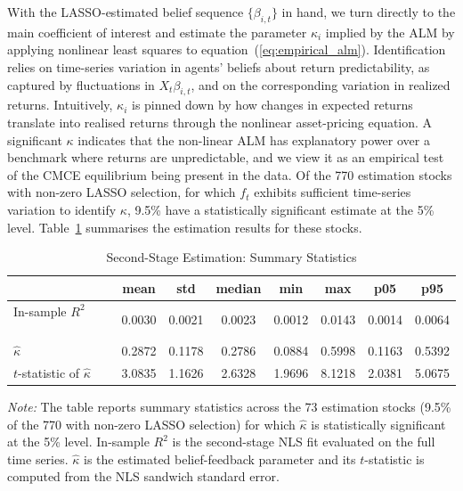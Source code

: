 \documentclass[11pt]{article}
\begin{document}
With the LASSO-estimated belief sequence $\{\beta_{i,t}\}$ in hand, we turn directly to the main coefficient of interest and estimate the parameter $\kappa_{i}$ implied by the ALM by applying nonlinear least squares to equation~(\ref{eq:empirical_alm}).
Identification relies on time-series variation in agents’ beliefs about return predictability, as captured by fluctuations in $X_t \beta_{i,t}$, and on the corresponding variation in realized returns.
Intuitively, $\kappa_{i}$ is pinned down by how changes in expected returns translate into realised returns through the nonlinear asset-pricing equation.
A significant $\kappa$ indicates that the non-linear ALM has explanatory power over a benchmark where returns are unpredictable, and we view it as an empirical test of the CMCE equilibrium being present in the data.
Of the 770 estimation stocks with non-zero LASSO selection, for which $f_t$ exhibits sufficient time-series variation to identify $\kappa$, 9.5\% have a statistically significant estimate at the 5\% level.
Table~\ref{tab:summary_stats_stage2} summarises the estimation results for these stocks.

\begin{table}[H]
\centering
\caption{Second-Stage Estimation: Summary Statistics}
\label{tab:summary_stats_stage2}
\begin{tabularx}{\textwidth}{@{}>{\small}Xccccccc@{}}
\toprule
 & mean & std & median & min & max & p05 & p95 \\
\midrule
In-sample $R^2$        & 0.0030 & 0.0021 & 0.0023 & 0.0012 & 0.0143 & 0.0014 & 0.0064 \\
$\hat{\kappa}$         & 0.2872 & 0.1178 & 0.2786 & 0.0884 & 0.5998 & 0.1163 & 0.5392 \\
$t$-statistic of $\hat{\kappa}$ & 3.0835 & 1.1626 & 2.6328 & 1.9696 & 8.1218 & 2.0381 & 5.0675 \\
\bottomrule
\end{tabularx}
\medskip
\begin{minipage}{\textwidth}
\footnotesize
\textit{Note:} The table reports summary statistics across the 73 estimation stocks (9.5\% of the 770 with non-zero LASSO selection) for which $\hat\kappa$ is statistically significant at the 5\% level.
In-sample $R^2$ is the second-stage NLS fit evaluated on the full time series.
$\hat{\kappa}$ is the estimated belief-feedback parameter and its $t$-statistic is computed from the NLS sandwich standard error.
\end{minipage}
\end{table}
\end{document}
